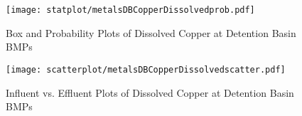         \begin{figure}[hb]   %
            \centering
            \texttt{[image: statplot/metalsDBCopperDissolvedprob.pdf]}
            \caption{Box and Probability Plots of Dissolved Copper at Detention Basin BMPs}
        \end{figure}         %
        
        
        \begin{figure}[hb]   %
            \centering
            \texttt{[image: scatterplot/metalsDBCopperDissolvedscatter.pdf]}
            \caption{Influent vs. Effluent Plots of Dissolved Copper at Detention Basin BMPs}
        \end{figure}         %
        \clearpage
        